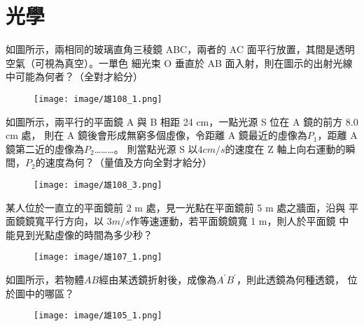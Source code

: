 \documentclass[cn,10pt,math=newtx,chinesefont=founder]{elegantbook}
\begin{document}
\chapter{光學}

\begin{example}
    如圖所示，兩相同的玻璃直角三稜鏡 ABC，兩者的 AC 面平行放置，其間是透明空氣（可視為真空）。一單色
    細光束 O 垂直於 AB 面入射，則在圖示的出射光線中可能為何者？（全對才給分）\\
    \rightline{[雄中科學班108]}
\end{example}
\begin{solution}
    
\end{solution}
\begin{figure}[htbp]
    \flushright
    \texttt{[image: image/雄108\_1.png]}
\end{figure}
\newpage

\begin{example}
    如圖所示，兩平行的平面鏡 A 與 B 相距 24 cm，一點光源 S 位在 A 鏡的前方 8.0 cm 處，
    則在 A 鏡後會形成無窮多個虛像，令距離 A 鏡最近的虛像為$P_1$，距離 A 鏡第二近的虛像為$P_2$………。
    則當點光源 S 以$4 cm/s$的速度在 Z 軸上向右運動的瞬間，$P_2$的速度為何？（量值及方向全對才給分）
\end{example}
\begin{solution}
    
\end{solution}
\begin{figure}[htbp]
    \flushright
    \texttt{[image: image/雄108\_3.png]}
\end{figure}
\newpage

\begin{example}
    某人位於一直立的平面鏡前 2 m 處，見一光點在平面鏡前 5 m 處之牆面，沿與
    平面鏡鏡寬平行方向，以 3$m/s$作等速運動，若平面鏡鏡寬 1 m，則人於平面鏡
    中能見到光點虛像的時間為多少秒？\\
    \rightline{[雄中科學班107]}
\end{example}
\begin{solution}
    
\end{solution}
\begin{figure}[htbp]
    \flushright
    \texttt{[image: image/雄107\_1.png]}
\end{figure}
\newpage

\begin{example}
    如圖所示，若物體$AB$經由某透鏡折射後，成像為$A^{'} B^{'}$，則此透鏡為何種透鏡，
    位於圖中的哪區？\\
    \rightline{[雄中科學班105]}
\end{example}
\begin{solution}
    
\end{solution}
\begin{figure}[htbp]
    \flushright
    \texttt{[image: image/雄105\_1.png]}
\end{figure}
\newpage
\end{document}
